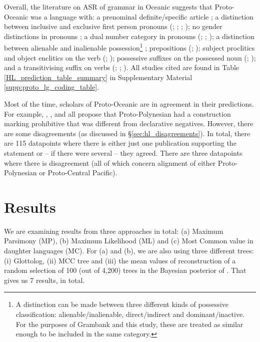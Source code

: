 \documentclass[12pt,letterpaper]{article}
\begin{document}
Overall, the literature on ASR of grammar in Oceanic suggests that Proto-Oceanic was a language with: a prenominal definite/specific article \citep[136]{crowley1985common}; a distinction between inclusive and exclusive first person pronouns (\citealt[112]{pawley1973some}; \citealt[184]{crowley1985common}; \citealt[500]{ross2004morphosyntactic}; \citealt[67, 75]{lynchrosscrowley_proto_grammar_oceanic}); no gender distinctions in pronouns \citep[498]{ross2004morphosyntactic}; a dual number category in pronouns (\citealt[498]{ross2004morphosyntactic}; \citealt[69]{lynchrosscrowley_proto_grammar_oceanic}; \citealt[173]{pawley1973some}); a distinction between alienable and inalienable possession\footnote{A distinction can be made between three different kinds of possessive classification: alienable/inalienable, direct/indirect and dominant/inactive. For the purposes of Grambank and this study, these are treated as similar enough to be included in the same category.} \citep[69]{lynchrosscrowley_proto_grammar_oceanic}; prepositions (\citealt[167]{pawley1973some}; \citealt[498]{ross2004morphosyntactic}); subject proclitics and object enclitics on the verb (\citealt[498-499]{ross2004morphosyntactic}; \citealt[83]{lynchrosscrowley_proto_grammar_oceanic}); possessive suffixes on the possessed noun (\citealt[495]{ross2004morphosyntactic}; \citealt[155]{pawley1973some}); and a transitivising suffix on verbs (\citealt[352]{pawley1970change}; \citealt[171]{pawley1973some}; \citealt[80, 92]{lynchrosscrowley_proto_grammar_oceanic}). All studies cited are found in Table \ref{HL_prediction_table_summary} in Supplementary Material \ref{supp:proto_lg_coding_table}.

Most of the time, scholars of Proto-Oceanic are in agreement in their predictions. For example, \citet[142]{pawley1973some}, \citet[292]{ross2007two}, \citet[xiii, 125]{clark1973aspects} and \citet[89]{lynchrosscrowley_proto_grammar_oceanic} all propose that Proto-Polynesian had a construction marking prohibitive that was different from declarative negatives. However, there are some disagreements (as discussed in §\ref{sec:hl_disagreements}). In total, there are 115 datapoints where there is either just one publication supporting the statement or -- if there were several -- they agreed. There are three datapoints where there is disagreement (all of which concern alignment of either Proto-Polynesian or Proto-Central Pacific).

\FloatBarrier
\section{Results}
We are examining results from three approaches in total: (a) Maximum Parsimony (MP), (b) Maximum Likelihood (ML) and (c) Most Common value in daughter languages (MC). For (a) and (b), we are also using three different trees: (i) Glottolog, (ii) \citet{grayetal_2009} MCC tree and (iii) the mean values of reconstruction of a random selection of 100 (out of 4,200) trees in the Bayesian posterior of \citet{grayetal_2009}. That gives us 7 results, in total.
\end{document}
